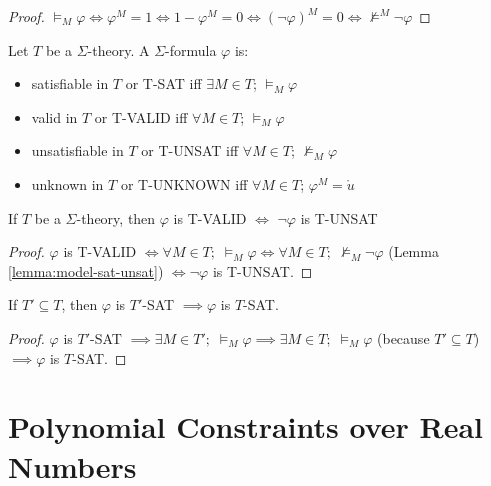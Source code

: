 \begin{proof}
$\models_M \varphi \iff \varphi^M = 1 \iff 1 - \varphi^M = 0 \iff (\neg \varphi)^M = 0 \iff \not\models^M \neg \varphi$
\end{proof}

\begin{definition}
Let $T$ be a $\Sigma$-theory. A $\Sigma$-formula $\varphi$ is:
\begin{itemize}
\item satisfiable in $T$ or T-SAT iff $\exists M \in T$; $\models_{M} \varphi$
\item valid in $T$ or T-VALID iff $\forall M \in T$; $\models_{M} \varphi$
\item unsatisfiable in $T$ or T-UNSAT iff $\forall M \in T$; $\not\models_{M} \varphi$
\item unknown in $T$ or T-UNKNOWN iff $\forall M \in T$; $\varphi^M = \mathring{u}$
\end{itemize}
\end{definition}

\begin{lemma} \label{lemma:theory-valid-unsat}
If $T$ be a $\Sigma$-theory, then $\varphi$ is T-VALID $\iff$ $\neg\varphi$ is T-UNSAT
\end{lemma}

\begin{proof}
$\varphi$ is T-VALID $\iff \forall M \in T; \; \models_{M} \varphi \iff \forall M \in T; \; \not\models_{M} \neg\varphi$ (Lemma \ref{lemma:model-sat-unsat}) $\iff \neg\varphi$ is T-UNSAT.
\end{proof}

\begin{lemma} \label{lemma:subtheory-SAT}
If $T' \subseteq T$, then $\varphi$ is $T'$-SAT $\implies \varphi$ is $T$-SAT.
\end{lemma}

\begin{proof}
$\varphi$ is $T'$-SAT $\implies \exists M \in T'; \; \models_M \varphi \implies \exists M \in T; \; \models_M \varphi$ (because $T' \subseteq T$) $\implies \varphi$ is $T$-SAT.
\end{proof}

\section{Polynomial Constraints over Real Numbers}
